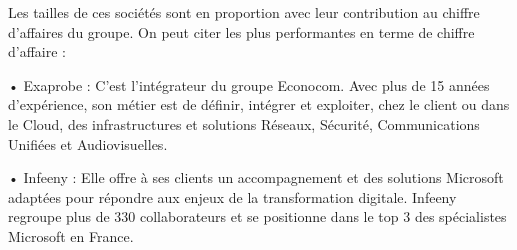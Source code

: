 Les tailles de ces sociétés sont en proportion avec leur contribution au chiffre
d’affaires du groupe. On peut citer les plus performantes en terme de chiffre d’affaire :

•   Exaprobe : C’est l’intégrateur du groupe Econocom. Avec plus de 15 années  
d’expérience, son métier est de définir, intégrer et exploiter, chez le client ou dans le Cloud, des infrastructures et solutions Réseaux, Sécurité, Communications Unifiées et Audiovisuelles.

•   Infeeny : Elle offre à ses clients un accompagnement et des solutions Microsoft
adaptées pour répondre aux enjeux de la transformation digitale. Infeeny regroupe plus de 330 collaborateurs et se positionne dans le top 3 des spécialistes Microsoft en France.



